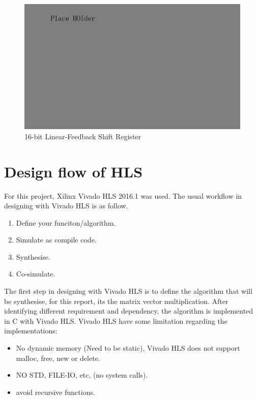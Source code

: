 \begin{figure} 
\includegraphics[scale=0.3]{Figures/placeholder}
\caption{16-bit Linear-Feedback Shift Register}
	\label{fig:LFSR}
\end{figure}


\section{Design flow of HLS}
For this project, Xilinx Vivado HLS 2016.1 was used. The usual workflow in designing with Vivado HLS is as follow. 
\begin{enumerate}
\item Define your funciton/algorithm.
\item Simulate as compile code. 
\item Synthesise.
\item Co-simulate.
\end{enumerate}

The first step in designing with Vivado HLS is to define the algorithm that will be synthesise, for this report, its the matrix vector multiplication. After identifying different requirement and dependency, the algorithm is implemented in C with Vivado HLS. Vivado HLS have some limitation regarding the implementations:
\begin{itemize}
\item No dynamic memory (Need to be static), Vivado HLS does not support malloc, free, new or delete. 
\item NO STD, FILE-IO, etc, (no system calls). 
\item avoid recursive functions. 
\end{itemize}

